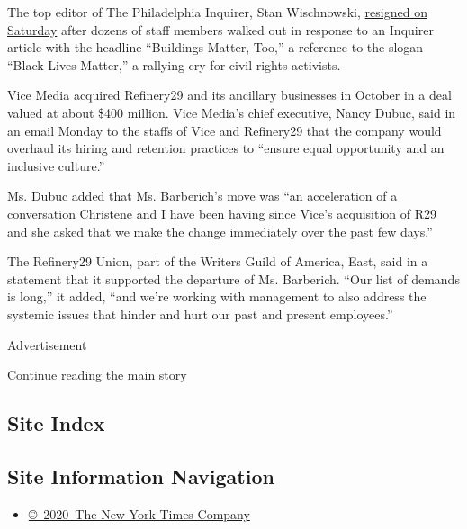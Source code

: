The top editor of The Philadelphia Inquirer, Stan Wischnowski,
\href{https://www.nytimes3xbfgragh.onion/2020/06/06/business/media/editor-philadephia-inquirer-resigns.html}{resigned
on Saturday} after dozens of staff members walked out in response to an
Inquirer article with the headline ``Buildings Matter, Too,'' a
reference to the slogan ``Black Lives Matter,'' a rallying cry for civil
rights activists.

Vice Media acquired Refinery29 and its ancillary businesses in October
in a deal valued at about \$400 million. Vice Media's chief executive,
Nancy Dubuc, said in an email Monday to the staffs of Vice and
Refinery29 that the company would overhaul its hiring and retention
practices to ``ensure equal opportunity and an inclusive culture.''

Ms. Dubuc added that Ms. Barberich's move was ``an acceleration of a
conversation Christene and I have been having since Vice's acquisition
of R29 and she asked that we make the change immediately over the past
few days.''

The Refinery29 Union, part of the Writers Guild of America, East, said
in a statement that it supported the departure of Ms. Barberich. ``Our
list of demands is long,'' it added, ``and we're working with management
to also address the systemic issues that hinder and hurt our past and
present employees.''

Advertisement

\protect\hyperlink{after-bottom}{Continue reading the main story}

\hypertarget{site-index}{%
\subsection{Site Index}\label{site-index}}

\hypertarget{site-information-navigation}{%
\subsection{Site Information
Navigation}\label{site-information-navigation}}

\begin{itemize}
\tightlist
\item
  \href{https://help.nytimes3xbfgragh.onion/hc/en-us/articles/115014792127-Copyright-notice}{©~2020~The
  New York Times Company}
\end{itemize}

